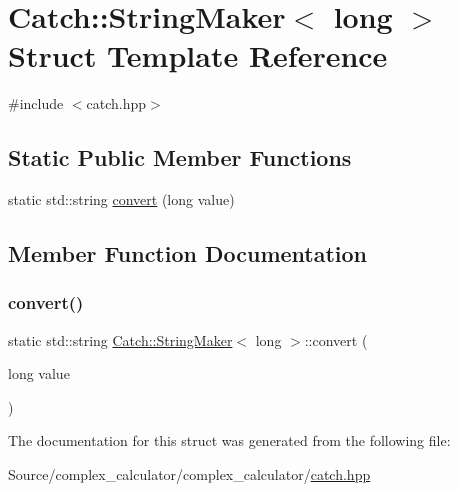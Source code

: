 \hypertarget{struct_catch_1_1_string_maker_3_01long_01_4}{}\section{Catch\+:\+:String\+Maker$<$ long $>$ Struct Template Reference}
\label{struct_catch_1_1_string_maker_3_01long_01_4}


{\ttfamily \#include $<$catch.\+hpp$>$}

\subsection*{Static Public Member Functions}
\begin{DoxyCompactItemize}
\item 
static std\+::string \mbox{\hyperlink{struct_catch_1_1_string_maker_3_01long_01_4_a1c0c56497813e7a6425c5411d5e66447}{convert}} (long value)
\end{DoxyCompactItemize}


\subsection{Member Function Documentation}
\mbox{\label{struct_catch_1_1_string_maker_3_01long_01_4_a1c0c56497813e7a6425c5411d5e66447}} 
\subsubsection{\texorpdfstring{convert()}{convert()}}
{\footnotesize\ttfamily static std\+::string \mbox{\hyperlink{struct_catch_1_1_string_maker}{Catch\+::\+String\+Maker}}$<$ long $>$\+::convert (\begin{DoxyParamCaption}\item[{long}]{value }\end{DoxyParamCaption})\hspace{0.3cm}{\ttfamily [static]}}



The documentation for this struct was generated from the following file\+:\begin{DoxyCompactItemize}
\item 
Source/complex\+\_\+calculator/complex\+\_\+calculator/\mbox{\hyperlink{catch_8hpp}{catch.\+hpp}}\end{DoxyCompactItemize}
